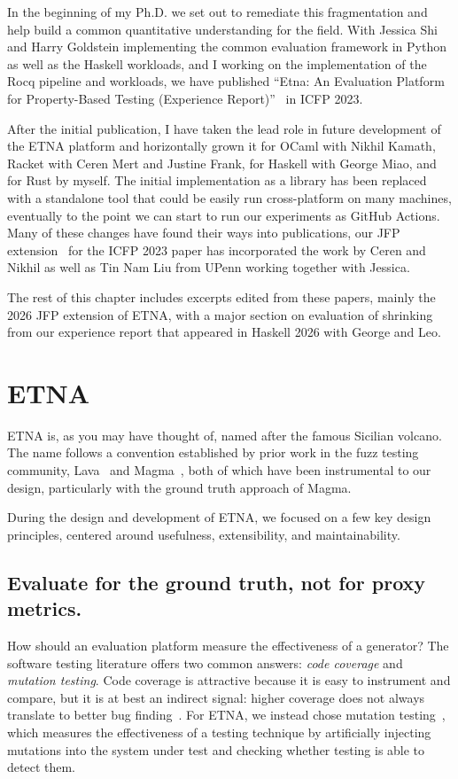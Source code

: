 In the beginning of my Ph.D. we set out to remediate this fragmentation and help build
a common quantitative understanding for the field. With Jessica Shi and Harry Goldstein
implementing the common evaluation framework in Python as well as the Haskell
workloads, and I working on the implementation of the Rocq pipeline and workloads, we
have published ``Etna: An Evaluation Platform for Property-Based Testing (Experience
Report)''~\cite{etna-icfp23} in ICFP 2023.

After the initial publication, I have taken the lead role in future development of the
ETNA platform and horizontally grown it for OCaml with Nikhil Kamath, Racket with Ceren
Mert and Justine Frank, for Haskell with George Miao, and for Rust by myself. The
initial implementation as a library has been replaced with a standalone tool that could
be easily run cross-platform on many machines, eventually to the point we can start to
run our experiments as GitHub Actions. Many of these changes have found their ways into
publications, our JFP extension~\cite{etna-jfp} for the ICFP 2023 paper has
incorporated the work by Ceren and Nikhil as well as Tin Nam Liu from UPenn working
together with Jessica.

The rest of this chapter includes excerpts edited from these papers, mainly the 2026
JFP extension of ETNA, with a major section on evaluation of shrinking from our
experience report that appeared in Haskell 2026 with George and Leo.

\section{ETNA} \label{sec:etna}

ETNA is, as you may have thought of, named after the famous Sicilian volcano. The name
follows a convention established by prior work in the fuzz testing community,
Lava~\cite{Lava} and Magma~\cite{Hazimeh:2020:Magma}, both of which have been
instrumental to our design, particularly with the ground truth approach of Magma.

During the design and development of ETNA, we focused on a few key design principles,
centered around usefulness, extensibility, and maintainability.

\subsection{Evaluate for the ground truth, not for proxy metrics.}

How should an evaluation platform measure the effectiveness of a generator? The
software testing literature offers two common answers: \emph{code coverage} and
\emph{mutation testing}. Code coverage is attractive because it is easy to instrument
and compare, but it is at best an indirect signal: higher coverage does not always
translate to better bug finding~\cite{GopinathJG14,EvaluatingFuzzTesting}. For ETNA, we
instead chose mutation testing~\cite{JiaH11}, which measures the effectiveness of a
testing technique by artificially injecting mutations into the system under test and
checking whether testing is able to detect them.

